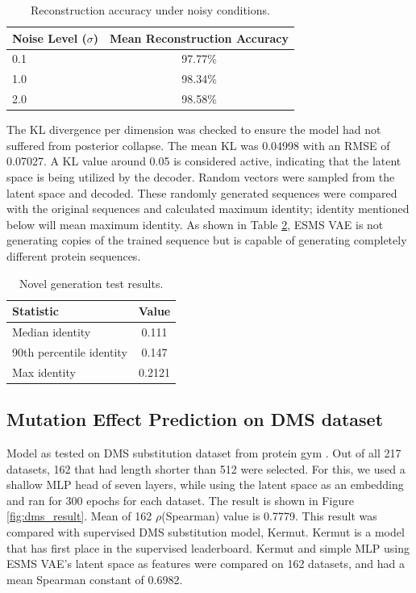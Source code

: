 \documentclass[unnumsec,webpdf,contemporary,medium]{oup-authoring-template}
\begin{document}
\begin{table}[!ht]
\caption{Reconstruction accuracy under noisy conditions.}\label{tab:noise_test}
\centering
\begin{tabular}{@{}lc@{}}
\toprule
\textbf{Noise Level ($\sigma$)} & \textbf{Mean Reconstruction Accuracy} \\
\midrule
0.1 & 97.77\% \\
1.0 & 98.34\% \\
2.0 & 98.58\% \\
\bottomrule
\end{tabular}
\end{table}

The KL divergence per dimension was checked to ensure the model had not suffered from posterior collapse. The mean KL was 0.04998 with an RMSE of 0.07027. A KL value around 0.05 is considered active, indicating that the latent space is being utilized by the decoder. Random vectors were sampled from the latent space and decoded. These randomly generated sequences were compared with the original sequences and calculated maximum identity; identity mentioned below will mean maximum identity. As shown in Table \ref{tab:novel_generation}, ESMS VAE is not generating copies of the trained sequence but is capable of generating completely different protein sequences.

\begin{table}[!ht]
\caption{Novel generation test results.}\label{tab:novel_generation}
\centering
\begin{tabular}{@{}lc@{}}
\toprule
\textbf{Statistic} & \textbf{Value} \\
\midrule
Median identity & 0.111 \\
90th percentile identity & 0.147\\
Max identity& 0.2121\\
\bottomrule
\end{tabular}
\end{table}

\subsection{Mutation Effect Prediction on DMS dataset}\label{sec:dms}
Model as tested on DMS substitution dataset from protein gym \cite{NEURIPS2023_cac723e5}. Out of all 217 datasets, 162 that had length shorter than 512 were selected. For this, we used a shallow MLP head of seven layers, while using the latent space as an embedding and ran for 300 epochs for each dataset. The result is shown in Figure \ref{fig:dms_result}. Mean of 162 $\rho$(Spearman) value is 0.7779. This result was compared with supervised DMS substitution model, Kermut. Kermut is a model that has first place in the supervised leaderboard. Kermut and simple MLP using ESMS VAE's latent space as features were compared on 162 datasets, and had a mean Spearman constant of 0.6982.
\end{document}
